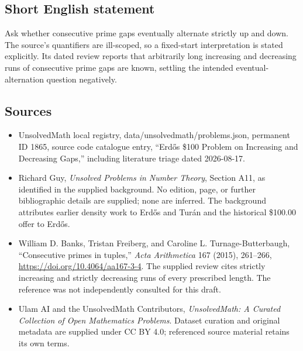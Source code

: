 \documentclass[11pt]{article}
\begin{document}
\subsection{Short English statement}
Ask whether consecutive prime gaps eventually alternate strictly up and down. The source's quantifiers are ill-scoped, so a fixed-start interpretation is stated explicitly. Its dated review reports that arbitrarily long increasing and decreasing runs of consecutive prime gaps are known, settling the intended eventual-alternation question negatively.
\subsection{Sources}
\begin{itemize}
\item UnsolvedMath local registry, data/unsolvedmath/problems.json, permanent ID 1865, source code catalogue entry, ``Erdős \$100 Problem on Increasing and Decreasing Gaps,'' including literature triage dated 2026-08-17.
\item Richard Guy, \emph{Unsolved Problems in Number Theory}, Section A11, as identified in the supplied background. No edition, page, or further bibliographic details are supplied; none are inferred. The background attributes earlier density work to Erdős and Turán and the historical \$100.00 offer to Erdős.
\item William D. Banks, Tristan Freiberg, and Caroline L. Turnage-Butterbaugh, ``Consecutive primes in tuples,'' \emph{Acta Arithmetica} 167 (2015), 261--266, \url{https://doi.org/10.4064/aa167-3-4}. The supplied review cites strictly increasing and strictly decreasing runs of every prescribed length. The reference was not independently consulted for this draft.
\item Ulam AI and the UnsolvedMath Contributors, \emph{UnsolvedMath: A Curated Collection of Open Mathematics Problems}. Dataset curation and original metadata are supplied under CC BY 4.0; referenced source material retains its own terms.
\end{itemize}
\end{document}
